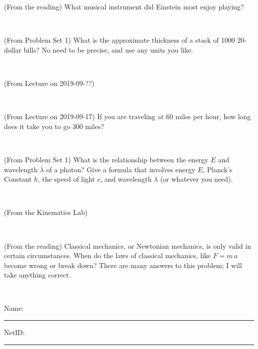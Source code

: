 \documentclass[12pt, letterpaper]{article}
\begin{document}
\begin{problem} (From the reading)
What musical instrument did Einstein most enjoy playing?
\end{problem}


\vfill ~

\begin{problem} (From Problem Set 1)
What is the approximate thickness of a stack of 1000 20-dollar bills?
No need to be precise, and use any units you like.
\end{problem}


\vfill ~

\begin{problem} (From Lecture on 2019-09-??)
\end{problem}


\vfill ~


\clearpage


\begin{problem} (From Lecture on 2019-09-17)
If you are traveling at 60 miles per hour, how long does
it take you to go 300 miles?
\end{problem}


\vfill ~

\begin{problem} (From Problem Set 1)
What is the relationship between the energy $E$ and wavelength
$\lambda$ of a photon? Give a formula that involves energy $E$,
Planck's Constant $h$, the speed of light $c$, and wavelength
$\lambda$ (or whatever you need).
\end{problem}

\vfill ~

\begin{problem} (From the Kinematics Lab)

\end{problem}


\vfill ~

\begin{problem} (From the reading)
Classical mechanics, or Newtonian mechanics, is only valid in certain
circumstances. When do the laws of classical mechanics, like $F =
m\,a$ become wrong or break down? There are many answers to this
problem; I will take anything correct.
\end{problem}


\vfill ~


\cleardoublepage



\noindent
Name: \rule[-1ex]{0.60\textwidth}{0.1pt}
NetID: \rule[-1ex]{0.20\textwidth}{0.1pt}
\end{document}
